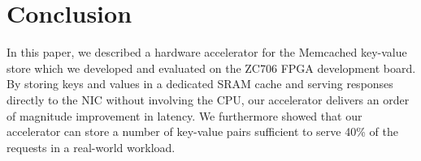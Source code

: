 \section{Conclusion}

In this paper, we described a hardware accelerator for the Memcached key-value
store which we developed and evaluated on the ZC706 FPGA development board.
By storing keys and values in a dedicated SRAM cache and serving responses
directly to the NIC without involving the CPU, our accelerator delivers an
order of magnitude improvement in latency. We furthermore showed that our
accelerator can store a number of key-value pairs sufficient to serve 40\% of
the requests in a real-world workload.
